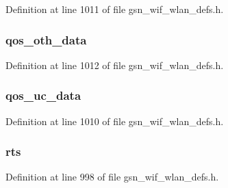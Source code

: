 Definition at line 1011 of file gsn\_\-wif\_\-wlan\_\-defs.h.

\hypertarget{a00398_a0dbfc3afda9c28bcf2483e45df0dffc3}{
\subsubsection[{qos\_\-oth\_\-data}]{ {\bf qos\_\-oth\_\-data}}}
\label{a00398_a0dbfc3afda9c28bcf2483e45df0dffc3}


Definition at line 1012 of file gsn\_\-wif\_\-wlan\_\-defs.h.

\hypertarget{a00398_a404694cb739b81ab849e54b48d4f1b18}{
\subsubsection[{qos\_\-uc\_\-data}]{ {\bf qos\_\-uc\_\-data}}}
\label{a00398_a404694cb739b81ab849e54b48d4f1b18}


Definition at line 1010 of file gsn\_\-wif\_\-wlan\_\-defs.h.

\hypertarget{a00398_ae530514c8e72d447e6649a02a96467fb}{
\subsubsection[{rts}]{ {\bf rts}}}
\label{a00398_ae530514c8e72d447e6649a02a96467fb}


Definition at line 998 of file gsn\_\-wif\_\-wlan\_\-defs.h.

